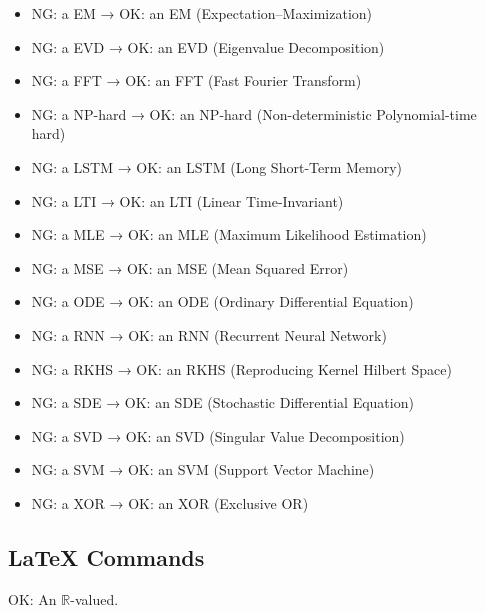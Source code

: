 \begin{itemize}
	\item NG: a EM → OK: an EM (Expectation--Maximization)
	\item NG: a EVD → OK: an EVD (Eigenvalue Decomposition)
	\item NG: a FFT → OK: an FFT (Fast Fourier Transform)
	\item NG: a NP-hard → OK: an NP-hard (Non-deterministic Polynomial-time hard)
	\item NG: a LSTM → OK: an LSTM (Long Short-Term Memory)
	\item NG: a LTI → OK: an LTI (Linear Time-Invariant)
	\item NG: a MLE → OK: an MLE (Maximum Likelihood Estimation)
	\item NG: a MSE → OK: an MSE (Mean Squared Error)
	\item NG: a ODE → OK: an ODE (Ordinary Differential Equation)
	\item NG: a RNN → OK: an RNN (Recurrent Neural Network)
	\item NG: a RKHS → OK: an RKHS (Reproducing Kernel Hilbert Space)
	\item NG: a SDE → OK: an SDE (Stochastic Differential Equation)
	\item NG: a SVD → OK: an SVD (Singular Value Decomposition)
	\item NG: a SVM → OK: an SVM (Support Vector Machine)
	\item NG: a XOR → OK: an XOR (Exclusive OR)
\end{itemize}

\subsection{LaTeX Commands}

OK: An $\mathbb{R}$-valued.

